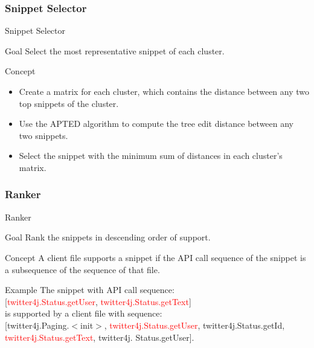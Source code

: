 \documentclass[11pt]{beamer}
\begin{document}
\subsubsection*{Snippet Selector}

\begin{frame}{Snippet Selector}
	\begin{block}{Goal}
		Select the most representative snippet of each cluster.
	\end{block}
	\begin{block}{Concept}
		\begin{itemize}
			\item{
			      Create a matrix for each cluster, which contains the distance between any two top snippets of the cluster.  
			}
			\item{
			      Use the APTED algorithm to compute the tree edit distance between any two snippets.
			}
			\item{
			      Select the snippet with the minimum sum of distances in each cluster's matrix.  
			}
		\end{itemize}
	\end{block}
\end{frame}

\subsubsection*{Ranker}

\begin{frame}{Ranker}
	\begin{block}{Goal}
		Rank the snippets in descending order of support.
	\end{block}
	\begin{block}{Concept}
		A client file supports a snippet if the API call sequence of the snippet is a subsequence of the sequence of that file.
	\end{block}
	\begin{exampleblock}{Example}
		The snippet with API call sequence:\\ 
		{[}\textcolor{red}{\textsf{twitter4j.Status.getUser}}, \textcolor{red}{\textsf{twitter4j.Status.getText}}]\\
		is supported by a client file with sequence:\\
		{[}\textsf{twitter4j.Paging.$<$init$>$}, \textcolor{red}{\textsf{twitter4j.Status.getUser}}, \textsf{twitter4j.Status.getId}, \textcolor{red}{\textsf{twitter4j.Status.getText}}, \textsf{twitter4j.} \textsf{Status.getUser}].
	\end{exampleblock}
\end{frame}
\end{document}
